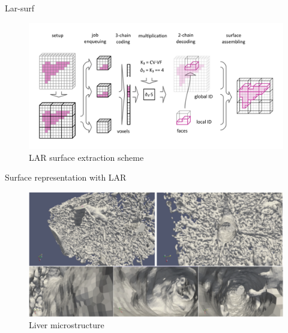 \documentclass[10pt]{beamer}
\begin{document}
\begin{frame}{Lar-surf}
\begin{figure}
    \centering
            \includegraphics[width=\textwidth]{figs/schema_horizontal.png}
    \caption{LAR surface extraction scheme}
\end{figure}
    
\end{frame}

\begin{frame}{Surface representation with LAR}
\begin{figure}
    \centering
            \includegraphics[width=\textwidth]{figs/paoluzzi_dicarlo_furiani_jirik_2016.png}
    \caption{Liver microstructure\cite{Paoluzzi2016}}
\end{figure}
    
\end{frame}
\end{document}
